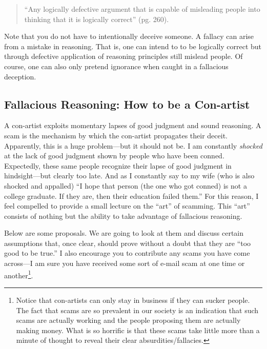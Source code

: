 \documentclass{article}
\begin{document}
\begin{definition} \cite{barker03logic}
\begin{quote}
``Any logically defective argument that is capable of misleading people into thinking that it is logically correct'' (pg. 260).
\end{quote}
\end{definition}

\begin{remark}
Note that you do not have to intentionally deceive someone. A fallacy can arise from a mistake in reasoning. That is, one can intend to to be logically correct but through defective application of reasoning principles still mislead people. Of course, one can also only pretend ignorance when caught in a fallacious deception.
\end{remark}

\newpage

\subsection{Fallacious Reasoning: How to be a Con-artist}
A con-artist exploits momentary lapses of good judgment and sound reasoning. A scam is the mechanism by which the con-artist propagates their deceit. Apparently, this is a huge problem---but it should not be. I am constantly \textsl{shocked} at the lack of good judgment shown by people who have been conned. Expectedly, these same people recognize their lapse of good judgment in hindsight---but clearly too late. And as I constantly say to my wife (who is also shocked and appalled) ``I hope that person (the one who got conned) is not a college graduate. If they are, then their education failed them.'' For this reason, I feel compelled to provide a small lecture on the ``art'' of scamming. This ``art'' consists of nothing but the ability to take advantage of fallacious reasoning.

Below are some proposals. We are going to look at them and discuss certain assumptions that, once clear, should prove without a doubt that they are ``too good to be true.'' I also encourage you to contribute any scams you have come across---I am sure you have received some sort of e-mail scam at one time or another\footnote{Notice that con-artists can only stay in business if they can sucker people. The fact that scams are so prevalent in our society is an indication that such scams are actually working and the people proposing them are actually making money. What is so horrific is that these scams take little more than a minute of thought to reveal their clear absurdities/fallacies.}.
\end{document}
